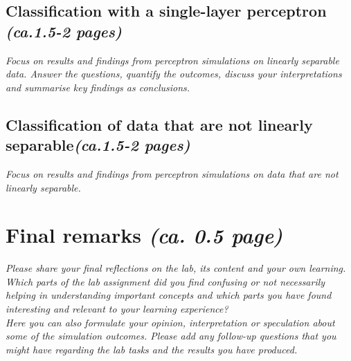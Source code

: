 \documentclass[a4paper]{article}
\begin{document}
\subsection{Classification with a single-layer perceptron \textit{(ca.1.5-2 pages)}}
\textit{Focus on results and findings from perceptron simulations on linearly separable data. Answer the questions, quantify the outcomes, discuss your interpretations and summarise key findings as conclusions.}

\subsection{Classification of data that are not linearly separable\textit{(ca.1.5-2 pages)}}
\textit{Focus on results and findings from perceptron simulations on data that are not linearly separable.}


\section{Final remarks \normalsize{\textit{(ca. 0.5 page)}}}
\textit{Please share your final reflections on the lab, its content and your own learning. Which parts of the lab assignment did you find confusing or not necessarily helping in understanding important concepts and which parts you have found interesting and relevant to your learning experience? \\
Here you can also formulate your opinion, interpretation or speculation about some of the simulation outcomes. Please add any follow-up questions that you might have regarding the lab tasks and the results you have produced.}
\end{document}
